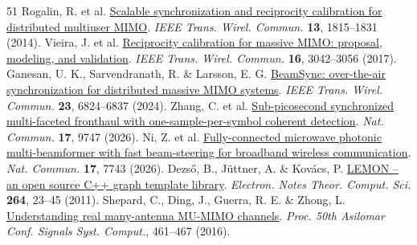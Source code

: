 \documentclass[10pt,letterpaper]{article}
\begin{document}
\begin{thebibliography}{51}
 Rogalin, R. et al. \href{https://doi.org/10.1109/TWC.2014.030314.130474}{Scalable synchronization and reciprocity calibration for distributed multiuser MIMO}. \emph{IEEE Trans. Wirel. Commun.} \textbf{13}, 1815–1831 (2014).
 Vieira, J. et al. \href{https://doi.org/10.1109/TWC.2017.2674659}{Reciprocity calibration for massive MIMO: proposal, modeling, and validation}. \emph{IEEE Trans. Wirel. Commun.} \textbf{16}, 3042–3056 (2017).
 Ganesan, U. K., Sarvendranath, R. \& Larsson, E. G. \href{https://doi.org/10.1109/TWC.2023.3335089}{BeamSync: over-the-air synchronization for distributed massive MIMO systems}. \emph{IEEE Trans. Wirel. Commun.} \textbf{23}, 6824–6837 (2024).
 Zhang, C. et al. \href{https://doi.org/10.1038/s41467-026-76739-2}{Sub-picosecond synchronized multi-faceted fronthaul with one-sample-per-symbol coherent detection}. \emph{Nat. Commun.} \textbf{17}, 9747 (2026).
 Ni, Z. et al. \href{https://doi.org/10.1038/s41467-026-74485-z}{Fully-connected microwave photonic multi-beamformer with fast beam-steering for broadband wireless communication}. \emph{Nat. Commun.} \textbf{17}, 7743 (2026).
 Dezső, B., Jüttner, A. \& Kovács, P. \href{https://doi.org/10.1016/j.entcs.2011.06.003}{LEMON – an open source C++ graph template library}. \emph{Electron. Notes Theor. Comput. Sci.} \textbf{264}, 23–45 (2011).
 Shepard, C., Ding, J., Guerra, R. E. \& Zhong, L. \href{https://doi.org/10.1109/ACSSC.2016.7869082}{Understanding real many-antenna MU-MIMO channels}. \emph{Proc. 50th Asilomar Conf. Signals Syst. Comput.}, 461–467 (2016).
\end{thebibliography}
\end{document}
